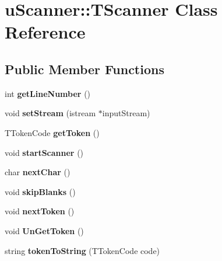 \hypertarget{classu_scanner_1_1_t_scanner}{\section{u\-Scanner\-:\-:T\-Scanner Class Reference}
\label{classu_scanner_1_1_t_scanner}
}
\subsection*{Public Member Functions}
\begin{DoxyCompactItemize}
\item 
\hypertarget{classu_scanner_1_1_t_scanner_acc1c6ef23070d0f10c9cc123bc9ecf58}{int {\bfseries get\-Line\-Number} ()}\label{classu_scanner_1_1_t_scanner_acc1c6ef23070d0f10c9cc123bc9ecf58}

\item 
\hypertarget{classu_scanner_1_1_t_scanner_acd9dc41852c8670225c3e90da3431346}{void {\bfseries set\-Stream} (istream $\ast$input\-Stream)}\label{classu_scanner_1_1_t_scanner_acd9dc41852c8670225c3e90da3431346}

\item 
\hypertarget{classu_scanner_1_1_t_scanner_a5715c0dce0138556084b9ff4fc21ce0e}{T\-Token\-Code {\bfseries get\-Token} ()}\label{classu_scanner_1_1_t_scanner_a5715c0dce0138556084b9ff4fc21ce0e}

\item 
\hypertarget{classu_scanner_1_1_t_scanner_a11b230fe4882be72290cf2d60b7b0716}{void {\bfseries start\-Scanner} ()}\label{classu_scanner_1_1_t_scanner_a11b230fe4882be72290cf2d60b7b0716}

\item 
\hypertarget{classu_scanner_1_1_t_scanner_afb64750ac8dc232e901ddc5367f39358}{char {\bfseries next\-Char} ()}\label{classu_scanner_1_1_t_scanner_afb64750ac8dc232e901ddc5367f39358}

\item 
\hypertarget{classu_scanner_1_1_t_scanner_a54eb0c22cae9d100918db4f5d62a224d}{void {\bfseries skip\-Blanks} ()}\label{classu_scanner_1_1_t_scanner_a54eb0c22cae9d100918db4f5d62a224d}

\item 
\hypertarget{classu_scanner_1_1_t_scanner_adb35ba751b7821228ac649126c787afb}{void {\bfseries next\-Token} ()}\label{classu_scanner_1_1_t_scanner_adb35ba751b7821228ac649126c787afb}

\item 
\hypertarget{classu_scanner_1_1_t_scanner_ad25f16b5829eef9a436761a35faee9f6}{void {\bfseries Un\-Get\-Token} ()}\label{classu_scanner_1_1_t_scanner_ad25f16b5829eef9a436761a35faee9f6}

\item 
\hypertarget{classu_scanner_1_1_t_scanner_ab0b2156e31509f0650af4d9a5e08db0b}{string {\bfseries token\-To\-String} (T\-Token\-Code code)}\label{classu_scanner_1_1_t_scanner_ab0b2156e31509f0650af4d9a5e08db0b}

\end{DoxyCompactItemize}
